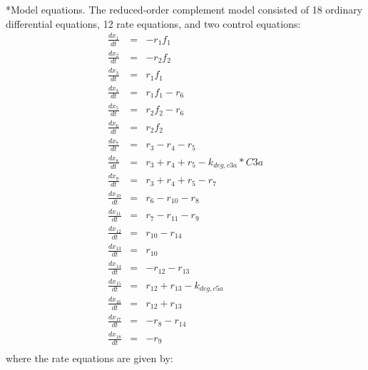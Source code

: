 \documentclass[12pt]{article}
\makeatletter
\renewcommand\subsection{\@startsection
	{subsection}{2}{0mm}
	{-0.05in}
	{-0.5\baselineskip}
	{\normalfont\normalsize\bfseries}}
\makeatother
\begin{document}
\subsection*{Model equations.}
The reduced-order complement model consisted of 18 ordinary differential equations, 12 rate equations, and two control equations:
\begin{eqnarray}
	\frac{dx_{1}}{dt} & =& - r_{1}f_{1} \\ 								%
	\frac{dx_{2}}{dt} &=& - r_{2}f_{2} \\  								%
	\frac{dx_{3}}{dt} &=&  r_{1}f_{1} \\ 								%
	\frac{dx_{4}}{dt} &=& r_{1}f_{1} - r_{6} \\ 					%
	\frac{dx_{5}}{dt} & = & r_{2}f_{2} - r_{6} \\ 					%
	\frac{dx_{6}}{dt} &=& r_{2}f_{2} \\ 								%
	\frac{dx_{7}}{dt} &=& r_{3} - r_{4} - r_{5}\\ 				%
	\frac{dx_{8}}{dt} &=& r_{3}  + r_{4} + r_{5}  - k_{deg,c3a}*C3a \\		%
	\frac{dx_{9}}{dt} &=& r_{3}  + r_{4} + r_{5}  -  r_{7} \\		%
	\frac{dx_{10}}{dt} &=& r_{6} - r_{10} -  r_{8} \\			%
	\frac{dx_{11}}{dt} &=& r_{7} - r_{11} -  r_{9} \\			%
	\frac{dx_{12}}{dt} &=& r_{10} - r_{14} \\							%
	\frac{dx_{13}}{dt} &=& r_{10}  \\											%
	\frac{dx_{14}}{dt} &=& - r_{12} - r_{13} \\								%
	\frac{dx_{15}}{dt} &=&  r_{12} + r_{13} - k_{deg,c5a} \\					%
	\frac{dx_{16}}{dt} &=& r_{12} + r_{13} \\								%
	\frac{dx_{17}}{dt} &=& - r_{8} - r_{14} \\  				         %
	\frac{dx_{18}}{dt} &=& - r_{9} \\									%
\end{eqnarray}where the rate equations are given by:
\end{document}
